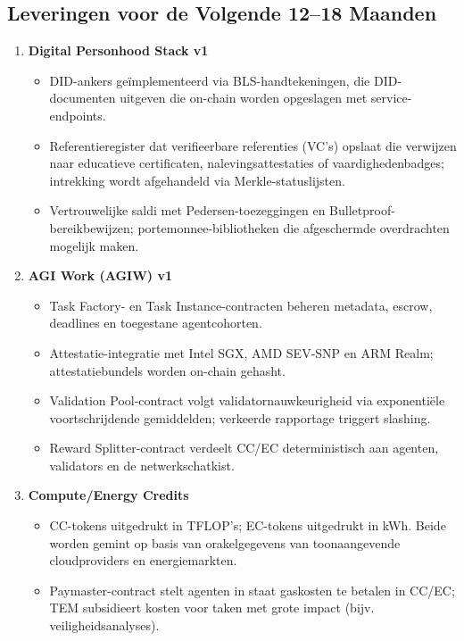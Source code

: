 \documentclass[11pt]{article}
\begin{document}
\subsection{Leveringen voor de Volgende 12--18 Maanden}
\begin{enumerate}[label=\textbf{D\arabic*.}, leftmargin=*]
  \item \textbf{Digital Personhood Stack v1}
  \begin{itemize}[noitemsep]
    \item DID-ankers geïmplementeerd via BLS-handtekeningen, die DID-documenten uitgeven die on-chain worden opgeslagen met service-endpoints.
    \item Referentieregister dat verifieerbare referenties (VC's) opslaat die verwijzen naar educatieve certificaten, nalevingsattestaties of vaardighedenbadges; intrekking wordt afgehandeld via Merkle-statuslijsten.
    \item Vertrouwelijke saldi met Pedersen-toezeggingen en Bulletproof-bereikbewijzen; portemonnee-bibliotheken die afgeschermde overdrachten mogelijk maken.
  \end{itemize}
  \item \textbf{AGI Work (AGIW) v1}
  \begin{itemize}[noitemsep]
    \item Task Factory- en Task Instance-contracten beheren metadata, escrow, deadlines en toegestane agentcohorten.
    \item Attestatie-integratie met Intel SGX, AMD SEV-SNP en ARM Realm; attestatiebundels worden on-chain gehasht.
    \item Validation Pool-contract volgt validatornauwkeurigheid via exponentiële voortschrijdende gemiddelden; verkeerde rapportage triggert slashing.
    \item Reward Splitter-contract verdeelt CC/EC deterministisch aan agenten, validators en de netwerkschatkist.
  \end{itemize}
  \item \textbf{Compute/Energy Credits}
  \begin{itemize}[noitemsep]
    \item CC-tokens uitgedrukt in TFLOP's; EC-tokens uitgedrukt in kWh. Beide worden gemint op basis van orakelgegevens van toonaangevende cloudproviders en energiemarkten.
    \item Paymaster-contract stelt agenten in staat gaskosten te betalen in CC/EC; TEM subsidieert kosten voor taken met grote impact (bijv. veiligheidsanalyses).
  \end{itemize}

\end{enumerate}
\end{document}
